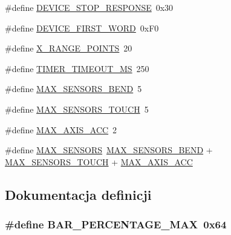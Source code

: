 \begin{DoxyCompactItemize}
\item 
\#define \hyperlink{mainwindow_8hh_a2bf91d3e64db936a4c8faec512c2cc4a}{D\+E\+V\+I\+C\+E\+\_\+\+S\+T\+O\+P\+\_\+\+R\+E\+S\+P\+O\+N\+SE}~0x30
\item 
\#define \hyperlink{mainwindow_8hh_a83c4f2725863d9524268295a3c1e1c5b}{D\+E\+V\+I\+C\+E\+\_\+\+F\+I\+R\+S\+T\+\_\+\+W\+O\+RD}~0x\+F0
\item 
\#define \hyperlink{mainwindow_8hh_a3904850627bd19733deda1e5e50ff785}{X\+\_\+\+R\+A\+N\+G\+E\+\_\+\+P\+O\+I\+N\+TS}~20
\item 
\#define \hyperlink{mainwindow_8hh_a1d627ae8800ceb62a5656dc9f73d626d}{T\+I\+M\+E\+R\+\_\+\+T\+I\+M\+E\+O\+U\+T\+\_\+\+MS}~250
\item 
\#define \hyperlink{mainwindow_8hh_a9b6a8b4c1dfb1de66193d68c8fc6f76b}{M\+A\+X\+\_\+\+S\+E\+N\+S\+O\+R\+S\+\_\+\+B\+E\+ND}~5
\item 
\#define \hyperlink{mainwindow_8hh_a76f9b12175b76431034f67b7dd709b1c}{M\+A\+X\+\_\+\+S\+E\+N\+S\+O\+R\+S\+\_\+\+T\+O\+U\+CH}~5
\item 
\#define \hyperlink{mainwindow_8hh_ad49d1d2e24c515031eb1b3a2cbf1a3ee}{M\+A\+X\+\_\+\+A\+X\+I\+S\+\_\+\+A\+CC}~2
\item 
\#define \hyperlink{mainwindow_8hh_aa3d1fc2927eec213e6b5f9e854c392d2}{M\+A\+X\+\_\+\+S\+E\+N\+S\+O\+RS}~\hyperlink{mainwindow_8hh_a9b6a8b4c1dfb1de66193d68c8fc6f76b}{M\+A\+X\+\_\+\+S\+E\+N\+S\+O\+R\+S\+\_\+\+B\+E\+ND} + \hyperlink{mainwindow_8hh_a76f9b12175b76431034f67b7dd709b1c}{M\+A\+X\+\_\+\+S\+E\+N\+S\+O\+R\+S\+\_\+\+T\+O\+U\+CH} + \hyperlink{mainwindow_8hh_ad49d1d2e24c515031eb1b3a2cbf1a3ee}{M\+A\+X\+\_\+\+A\+X\+I\+S\+\_\+\+A\+CC}
\end{DoxyCompactItemize}


\subsection{Dokumentacja definicji}
\subsubsection[{\texorpdfstring{B\+A\+R\+\_\+\+P\+E\+R\+C\+E\+N\+T\+A\+G\+E\+\_\+\+M\+AX}{BAR_PERCENTAGE_MAX}}]{\setlength{\rightskip}{0pt plus 5cm}\#define B\+A\+R\+\_\+\+P\+E\+R\+C\+E\+N\+T\+A\+G\+E\+\_\+\+M\+AX~0x64}\hypertarget{mainwindow_8hh_a512a133f28a338d26ec784d3af2b5389}{}\label{mainwindow_8hh_a512a133f28a338d26ec784d3af2b5389}
